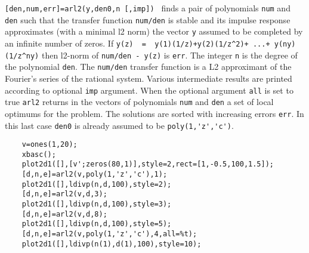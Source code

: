 \begin{mandescription}
  \verb![den,num,err]=arl2(y,den0,n [,imp]) ! finds a pair of polynomials
  \verb!num! and \verb!den! such that the transfer function \verb!num/den!
  is stable and its impulse response approximates (with a minimal l2
  norm) the vector \verb!y! assumed to be completed by an infinite number of zeros.
  If \verb!y(z)  =  y(1)(1/z)+y(2)(1/z^2)+ ...+ y(ny)(1/z^ny)!
  then l2-norm of \verb!num/den - y(z)! is \verb!err!. The integer 
  \verb!n! is the degree of the polynomial \verb!den!.
  The \verb!num/den!  transfer function is a L2 approximant of the
  Fourier's series of the rational system.
  Various intermediate results are printed according to optional \verb!imp! argument. 
  When the optional argument \verb!all! is set to true \verb!arl2! returns in the
  vectors of polynomials \verb!num! and \verb!den!  a set of local
  optimums for the problem. The solutions are sorted with increasing
  errors \verb!err!. In this last case \verb!den0! is already assumed to be 
  \verb!poly(1,'z','c')!.
\end{mandescription}
\begin{examples}
  \begin{Verbatim}
    v=ones(1,20);
    xbasc();
    plot2d1([],[v';zeros(80,1)],style=2,rect=[1,-0.5,100,1.5]);
    [d,n,e]=arl2(v,poly(1,'z','c'),1);
    plot2d1([],ldivp(n,d,100),style=2);
    [d,n,e]=arl2(v,d,3);
    plot2d1([],ldivp(n,d,100),style=3);
    [d,n,e]=arl2(v,d,8);
    plot2d1([],ldivp(n,d,100),style=5);
    [d,n,e]=arl2(v,poly(1,'z','c'),4,all=%t);
    plot2d1([],ldivp(n(1),d(1),100),style=10);
  \end{Verbatim}
\end{examples}
\begin{manseealso}
\end{manseealso}
